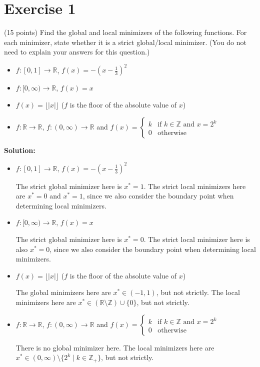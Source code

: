 \documentclass{article}
\begin{document}
\section*{Exercise 1}
(15 points) Find the global and local minimizers of the following functions. For each minimizer, state whether it is a strict global/local minimizer. (You do not need to explain your answers for this question.)

\begin{itemize}
    \item $f: [0,1] \to \mathbb{R}$, $f(x) = -(x-\frac{1}{3})^2$
    \item $f: [0,\infty) \to \mathbb{R}$, $f(x) = x$
    \item $f(x) = \lfloor|x|\rfloor$ ($f$ is the floor of the absolute value of $x$)
    \item $f: \mathbb{R} \to \mathbb{R}$, $f: (0,\infty) \to \mathbb{R}$ and $f(x) = \begin{cases} 
        k & \text{if } k \in \mathbb{Z} \text{ and } x = 2^k \\
        0 & \text{otherwise}
    \end{cases}$
\end{itemize}

\textbf{Solution:}

\begin{itemize}
    \item $f: [0,1] \to \mathbb{R}$, $f(x) = -(x-\frac{1}{3})^2$
    
    The strict global minimizer here is $x^* = 1$. The strict local minimizers here are $x^* = 0$ and $x^* = 1$, since we also consider the boundary point when determining local minimizers.
    \item $f: [0,\infty) \to \mathbb{R}$, $f(x) = x$
    
    The strict global minimizer here is $x^* = 0$. The strict local minimizer here is also $x^* = 0$, since we also consider the boundary point when determining local minimizers.
    \item $f(x) = \lfloor|x|\rfloor$ ($f$ is the floor of the absolute value of $x$)
    
    The global minimizers here are $x^* \in (-1, 1)$, but not strictly. The local minimizers here are $x^* \in (\mathbb{R} \setminus \mathbb{Z}) \cup \{0\}$, but not strictly.
    \item $f: \mathbb{R} \to \mathbb{R}$, $f: (0,\infty) \to \mathbb{R}$ and $f(x) = \begin{cases} 
        k & \text{if } k \in \mathbb{Z} \text{ and } x = 2^k \\
        0 & \text{otherwise}
    \end{cases}$

    There is no global minimizer here. The local minimizers here are $x^* \in (0, \infty) \setminus \{2^k \mid k \in \mathbb{Z}_{+}\}$, but not strictly.
\end{itemize}
\end{document}
